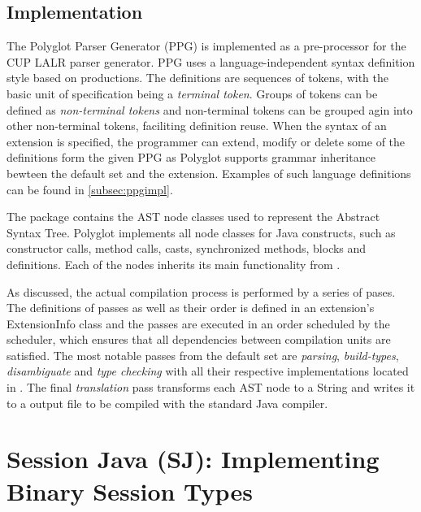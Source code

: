 \subsection{Implementation}
\label{subsec:polyglotimpl}

The Polyglot Parser Generator (PPG) is implemented as a pre-processor for the CUP LALR parser generator\cite{cuplalr}. PPG uses a language-independent syntax definition style based on productions. The definitions are sequences of tokens, with the basic unit of specification being a \textit{terminal token}. Groups of tokens can be defined as \textit{non-terminal tokens} and non-terminal tokens can be grouped agin into other non-terminal tokens, faciliting definition reuse. When the syntax of an extension is specified, the programmer can extend, modify or delete some of the definitions form the given PPG as Polyglot supports grammar inheritance bewteen the default set and the extension. Examples of such language definitions can be found in \autoref{subsec:ppgimpl}.

The package  contains the AST node classes used to represent the Abstract Syntax Tree. Polyglot implements all node classes for Java constructs, such as constructor calls, method calls, casts, synchronized methods, blocks and definitions. Each of the nodes inherits its main functionality from .

As discussed, the actual compilation process is performed by a series of pases. The definitions of passes as well as their order is defined in an extension's ExtensionInfo class and the passes are executed in an order scheduled by the scheduler, which ensures that all dependencies between compilation units are satisfied. The most notable passes from the default set are \textit{parsing}, \textit{build-types}, \textit{disambiguate} and \textit{type checking} with all their respective implementations located in . The final \textit{translation} pass transforms each AST node to a String and writes it to a  output file to be compiled with the standard Java compiler.

		
		
\section{Session Java (SJ): Implementing Binary Session Types}
\label{sec:sessionj}

